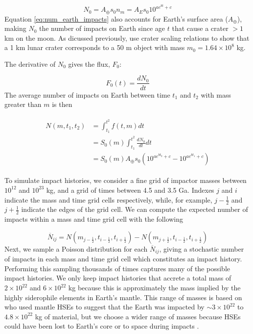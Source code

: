 \documentclass[preprint]{aastex63}
\begin{document}
\begin{equation}
  N_0 = A_\oplus s_0 n_m = A_E s_0 10^{a e^{b t} + c}
  \label{eq:num_earth_impacts}
\end{equation}
Equation \eqref{eq:num_earth_impacts} also accounts for Earth's surface area ($A_\oplus$), making $N_0$ the number of impacts on Earth since age $t$ that cause a crater $> 1$ km on the moon. As dicussed previously, \citet{Morbidelli_2018} use crater scaling relations to show that a 1 km lunar crater corresponds to a 50 m object with mass $m_0 = 1.64 \times 10^8$ kg.

The derivative of $N_0$ gives the flux, $F_0$:

\begin{equation}
  F_0(t) = \frac{d N_0}{dt}
\end{equation}
The average number of impacts on Earth between time $t_1$ and $t_2$ with mass greater than $m$ is then

\begin{align}
\begin{split}
  N(m,t_1,t_2) &= \int_{t_1}^{t^2} f(t,m) dt \\
  &= S_0(m) \int_{t_1}^{t^2} \frac{d N_0}{dt} dt \\
  &= S_0(m) A_\oplus s_0 \left( 10^{a e^{b t_2} + c} - 10^{a e^{b t_1} + c} \right)
\end{split}
\end{align}

To simulate impact histories, we consider a fine grid of impactor masses between $10^{12}$ and $10^{23}$ kg, and a grid of times between 4.5 and 3.5 Ga. Indexes $j$ and $i$ indicate the mass and time grid cells respectively, while, for example, $j-\frac{1}{2}$ and $j+\frac{1}{2}$ indicate the edges of the grid cell. We can compute the expected number of impacts within a mass and time grid cell with the following

\begin{equation}
  \overline{N}_{ij} = N(m_{j-\frac{1}{2}},t_{i-\frac{1}{2}},t_{i+\frac{1}{2}}) - N(m_{j+\frac{1}{2}},t_{i-\frac{1}{2}},t_{i+\frac{1}{2}})
\end{equation}
Next, we sample a Poisson distribution for each $\overline{N}_{ij}$, giving a stochastic number of impacts in each mass and time grid cell which constitutes an impact history. Performing this sampling thousands of times captures many of the possible impact histories. We only keep impact histories that accrete a total mass of $2 \times 10^{22}$ and $6 \times 10^{22}$ kg because this is approximately the mass implied by the highly siderophile elements in Earth's mantle. This range of masses is based on \citet{Day_2015} who used mantle HSEs to suggest that the Earth was impacted by $\sim 3 \times 10^{22}$ to $4.8 \times 10^{22}$ kg of material, but we choose a wider range of masses because HSEs could have been lost to Earth's core or to space during impacts \citep{Marchi_2018}.
\end{document}
